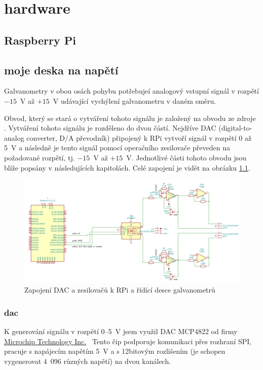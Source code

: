 \chapter{hardware}

\section{Raspberry Pi}



\section{moje deska na napětí}
Galvanometry v obou osách pohybu potřebujeí analogový vstupní signál v rozpětí $-15$~V až $+15$~V udávající vychýlení galvanometru v daném směru.

Obvod, který se stará o vytváření tohoto signálu je založený na obvodu ze zdroje \cite{lasershow-with-real-galvos}.
Vytváření tohoto signálu je rozděleno do dvou částí. Nejdříve DAC (digital-to-analog converter, D/A převodník) připojený k RPi vytvoří signál v rozpětí 0 až 5~V a následně je tento signál pomocí operačního zesilovače převeden na požadované rozpětí, tj. $-15$~V až $+15$~V.
Jednotlivé části tohoto obvodu jsou blíže popsány v následujících kapitolách. Celé zapojení je vidět na obrázku \ref{fig:dac_board}.
\begin{figure}[!htb]
  \centering
  \includegraphics[width=1\textwidth]{img/dac_board.png} 
  \caption{\label{fig:dac_board}Zapojení DAC a zesilovačů k RPi a řídící desce galvanometrů}
\end{figure}

\subsection{dac}
K generování signálu v rozpětí 0--5~V jsem využil DAC MCP4822 od firmy \href{https://www.microchip.com}{Microchip Technology Inc.}\ 
Tento čip podporuje komunikaci přes rozhraní SPI, pracuje s napájecím napětím 5~V a s 12bitovým rozlišením (je schopen vygenerovat 4~096 různých napětí) na dvou kanálech.

